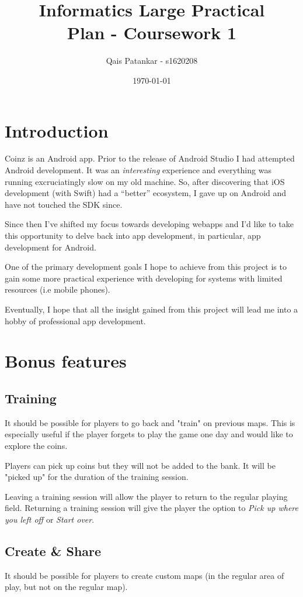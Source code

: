 \documentclass[a4paper]{article}
\title{Informatics Large Practical \\ \large{Plan - Coursework 1}}
\author{Qais Patankar - s1620208}
\date{\today}
\begin{document}
\maketitle

\section{Introduction}
\label{sec:introduction}

Coinz is an Android app. Prior to the release of Android Studio I had attempted Android development. It was an \textit{interesting} experience and everything was running excruciatingly slow on my old machine. So, after discovering that iOS development (with Swift) had a ``better'' ecosystem, I gave up on Android and have not touched the SDK since.

Since then I've shifted my focus towards developing webapps and I'd like to take this opportunity to delve back into app development, in particular, app development for Android.

One of the primary development goals I hope to achieve from this project is to gain some more practical experience with developing for systems with limited resources (i.e mobile phones).

Eventually, I hope that all the insight gained from this project will lead me into a hobby of professional app development.

\section{Bonus features}
\label{sec:bonus}

\subsection{Training}
It should be possible for players to go back and "train" on previous maps. This is especially useful if the player forgets to play the game one day and would like to explore the coins.

Players can pick up coins but they will not be added to the bank. It will be "picked up" for the duration of the training session.

Leaving a training session will allow the player to return to the regular playing field. Returning a training session will give the player the option to \emph{Pick up where you left off} or \emph{Start over}.

\subsection{Create \& Share}
It should be possible for players to create custom maps (in the regular area of play, but not on the regular map).
\end{document}
